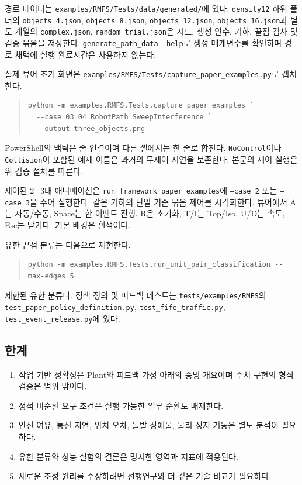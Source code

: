 \documentclass[11pt,a4paper]{article}
\theoremstyle{remark}
\begin{document}
경로 데이터는 \nolinkurl{examples/RMFS/Tests/data/generated/}에 있다. \texttt{density12} 하위 폴더의 \texttt{objects\_4.json}, \texttt{objects\_8.json}, \texttt{objects\_12.json}, \texttt{objects\_16.json}과 별도 계열의 \texttt{complex.json}, \texttt{random\_trial.json}은 시드, 생성 인수, 기하, 끝점 검사 및 검증 묶음을 저장한다. \texttt{generate\_path\_data --help}로 생성 매개변수를 확인하며 경로 채택에 실행 완료시간은 사용하지 않는다.

실제 뷰어 초기 화면은 \nolinkurl{examples/RMFS/Tests/capture_paper_examples.py}로 캡처한다.
\begin{quote}\small\begin{verbatim}
python -m examples.RMFS.Tests.capture_paper_examples `
  --case 03_04_RobotPath_SweepInterference `
  --output three_objects.png
\end{verbatim}\end{quote}
PowerShell의 백틱은 줄 연결이며 다른 셸에서는 한 줄로 합친다. \texttt{NoControl}이나 \texttt{Collision}이 포함된 예제 이름은 과거의 무제어 시연을 보존한다. 본문의 제어 실행은 위 검증 절차를 따른다.

제어된 2·3대 애니메이션은 \nolinkurl{run_framework_paper_examples}에 \texttt{--case 2} 또는 \texttt{--case 3}을 주어 실행한다. 같은 기하의 단일 기준 묶음 제어를 시각화한다. 뷰어에서 A는 자동/수동, Space는 한 이벤트 진행, R은 초기화, T/I는 Top/Iso, U/D는 속도, Esc는 닫기다. 기본 배경은 흰색이다.

유한 끝점 분류는 다음으로 재현한다.
\begin{quote}\small\begin{verbatim}
python -m examples.RMFS.Tests.run_unit_pair_classification --max-edges 5
\end{verbatim}\end{quote}
제한된 유한 분류다. 정책 정의 및 피드백 테스트는 \nolinkurl{tests/examples/RMFS}의 \nolinkurl{test_paper_policy_definition.py}, \nolinkurl{test_fifo_traffic.py}, \nolinkurl{test_event_release.py}에 있다.

\subsection{한계}
\begin{enumerate}
\item 작업 기반 정확성은 Plant와 피드백 가정 아래의 증명 개요이며 수치 구현의 형식 검증은 범위 밖이다.
\item 정적 비순환 요구 조건은 실행 가능한 일부 순환도 배제한다.
\item 안전 여유, 통신 지연, 위치 오차, 돌발 장애물, 물리 정지 거동은 별도 분석이 필요하다.
\item 유한 분류와 성능 실험의 결론은 명시한 영역과 지표에 적용된다.
\item 새로운 조정 원리를 주장하려면 선행연구와 더 깊은 기술 비교가 필요하다.
\end{enumerate}
\end{document}
